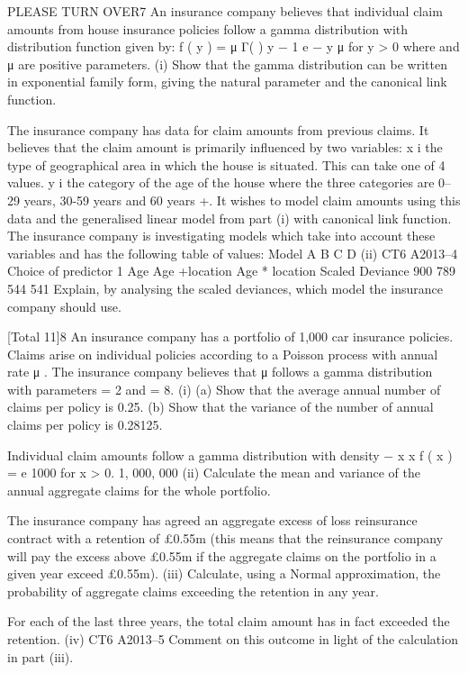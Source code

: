 PLEASE TURN OVER7
An insurance company believes that individual claim amounts from house insurance
policies follow a gamma distribution with distribution function given by:
f ( y ) =
\alpha \alpha
μ \alpha Γ( \alpha )
y
\alpha− 1
e
\alpha
− y
μ
for y > 0
where \alpha and μ are positive parameters.
(i)
Show that the gamma distribution can be written in exponential family form,
giving the natural parameter and the canonical link function.

The insurance company has data for claim amounts from previous claims. It believes
that the claim amount is primarily influenced by two variables:
x i the type of geographical area in which the house is situated. This can take
one of 4 values.
y i the category of the age of the house where the three categories are 0–29
years, 30-59 years and 60 years +.
It wishes to model claim amounts using this data and the generalised linear model
from part (i) with canonical link function. The insurance company is investigating
models which take into account these variables and has the following table of values:
Model
A
B
C
D
(ii)
CT6 A2013–4
Choice of
predictor
1
Age
Age +location
Age * location
Scaled Deviance
900
789
544
541
Explain, by analysing the scaled deviances, which model the insurance
company should use.

[Total 11]8
An insurance company has a portfolio of 1,000 car insurance policies. Claims arise
on individual policies according to a Poisson process with annual rate μ . The
insurance company believes that μ follows a gamma distribution with parameters
\alpha = 2 and \lambda = 8.
(i)
(a) Show that the average annual number of claims per policy is 0.25.
(b) Show that the variance of the number of annual claims per policy is
0.28125.

Individual claim amounts follow a gamma distribution with density
− x
x
f ( x ) =
e 1000 for x > 0.
1, 000, 000
(ii)
Calculate the mean and variance of the annual aggregate claims for the whole
portfolio.

The insurance company has agreed an aggregate excess of loss reinsurance contract
with a retention of £0.55m (this means that the reinsurance company will pay the
excess above £0.55m if the aggregate claims on the portfolio in a given year exceed
£0.55m).
(iii)
Calculate, using a Normal approximation, the probability of aggregate claims
exceeding the retention in any year.

For each of the last three years, the total claim amount has in fact exceeded the
retention.
(iv)
CT6 A2013–5
Comment on this outcome in light of the calculation in part (iii).


